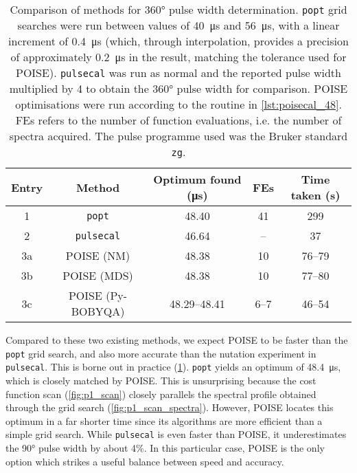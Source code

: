 \begin{table}
    \centering
    \begin{tabular}{ccccc}
        \toprule
        Entry & Method & Optimum found (\si{\us}) & FEs & Time taken (\si{\s}) \\
        \midrule
        1  & \texttt{popt}      & 48.40        & 41   & 299    \\
        2  & \texttt{pulsecal}  & 46.64        & --   & 37     \\
        3a & POISE (NM)         & 48.38        & 10   & 76--79 \\
        3b & POISE (MDS)        & 48.38        & 10   & 77--80 \\
        3c & POISE (Py-BOBYQA)  & 48.29--48.41 & 6--7 & 46--54 \\
        \bottomrule
    \end{tabular}
    \caption[Comparison of methods for \ang{360} pulse width determination]{
        Comparison of methods for \ang{360} pulse width determination.
        \texttt{popt} grid searches were run between values of \SI{40}{\us} and \SI{56}{\us}, with a linear increment of \SI{0.4}{\us} (which, through interpolation, provides a precision of approximately \SI{0.2}{\us} in the result, matching the tolerance used for POISE).
        \texttt{pulsecal} was run as normal and the reported pulse width multiplied by 4 to obtain the \ang{360} pulse width for comparison.
        POISE optimisations were run according to the routine in \cref{lst:poisecal_48}.
        FEs refers to the number of function evaluations, i.e. the number of spectra acquired.
        The pulse programme used was the Bruker standard \texttt{zg}.
    }
    \label{tbl:poisecal_48}
\end{table}

Compared to these two existing methods, we expect POISE to be faster than the \texttt{popt} grid search, and also more accurate than the nutation experiment in \texttt{pulsecal}.
This is borne out in practice (\cref{tbl:poisecal_48}).
\texttt{popt} yields an optimum of \SI{48.4}{\us}, which is closely matched by POISE.
This is unsurprising because the cost function scan (\cref{fig:p1_scan}) closely parallels the spectral profile obtained through the grid search (\cref{fig:p1_scan_spectra}).
However, POISE locates this optimum in a far shorter time since its algorithms are more efficient than a simple grid search.
While \texttt{pulsecal} is even faster than POISE, it underestimates the \ang{90} pulse width by about 4\%.
In this particular case, POISE is the only option which strikes a useful balance between speed and accuracy.

